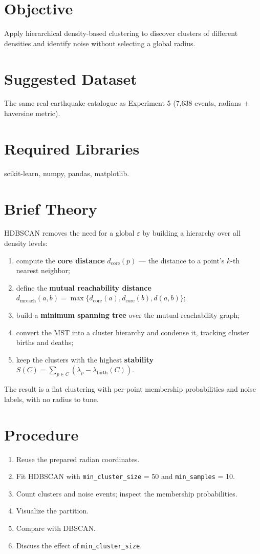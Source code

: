 \section{Objective}
Apply hierarchical density-based clustering to discover clusters of different densities and
identify noise without selecting a global radius.

\section{Suggested Dataset}
The same real earthquake catalogue as Experiment 5 (7,638 events, radians + haversine metric).

\section{Required Libraries}
scikit-learn, numpy, pandas, matplotlib.

\section{Brief Theory}
HDBSCAN removes the need for a global $\varepsilon$ by building a hierarchy over all density
levels:
\begin{enumerate}
  \item compute the \textbf{core distance} $d_{\text{core}}(p)$ --- the distance to a point's
        $k$-th nearest neighbor;
  \item define the \textbf{mutual reachability distance}
        $d_{\text{mreach}}(a,b) = \max\{d_{\text{core}}(a), d_{\text{core}}(b), d(a,b)\}$;
  \item build a \textbf{minimum spanning tree} over the mutual-reachability graph;
  \item convert the MST into a cluster hierarchy and condense it, tracking cluster births and
        deaths;
  \item keep the clusters with the highest \textbf{stability}
        $S(C) = \sum_{p \in C} (\lambda_p - \lambda_{\text{birth}}(C))$.
\end{enumerate}
The result is a flat clustering with per-point membership probabilities and noise labels, with
no radius to tune.

\section{Procedure}
\begin{enumerate}
  \item Reuse the prepared radian coordinates.
  \item Fit HDBSCAN with \texttt{min\_cluster\_size} = 50 and \texttt{min\_samples} = 10.
  \item Count clusters and noise events; inspect the membership probabilities.
  \item Visualize the partition.
  \item Compare with DBSCAN.
  \item Discuss the effect of \texttt{min\_cluster\_size}.
\end{enumerate}

